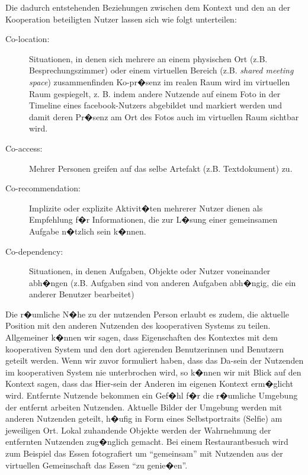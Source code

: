 Die dadurch entstehenden Beziehungen zwischen dem Kontext und den an der Kooperation beteiligten Nutzer lassen sich wie folgt unterteilen:

\begin{description}

\item[Co-location:]  Situationen, in denen sich mehrere an einem physischen Ort (z.B. Besprechungszimmer) oder einem virtuellen Bereich (z.B. \textit{shared meeting space}) zusammenfinden
Ko-pr�senz im realen Raum wird im virtuellen Raum gespiegelt, z. B. indem andere Nutzende auf einem Foto in der Timeline eines facebook-Nutzers abgebildet und markiert werden und damit deren Pr�senz am Ort des Fotos auch im virtuellen Raum sichtbar wird.


\item[Co-access:] Mehrer Personen greifen auf das selbe Artefakt (z.B. Textdokument) zu.

\item[Co-recommendation:] Implizite oder explizite Aktivit�ten mehrerer Nutzer dienen als Empfehlung f�r Informationen, die zur L�sung einer gemeinsamen Aufgabe n�tzlich sein k�nnen.

\item[Co-dependency:] Situationen, in denen Aufgaben, Objekte oder Nutzer voneinander abh�ngen (z.B. Aufgaben sind von anderen Aufgaben abh�ngig, die ein anderer Benutzer bearbeitet)

\end{description}

Die r�umliche N�he zu der nutzenden Person erlaubt es zudem, die aktuelle Position mit den anderen Nutzenden des kooperativen Systems zu teilen. Allgemeiner k�nnen wir sagen, dass Eigenschaften des Kontextes mit dem kooperativen System und den dort agierenden Benutzerinnen und Benutzern geteilt werden. Wenn wir zuvor formuliert haben, dass das Da-sein der Nutzenden im kooperativen System nie unterbrochen wird, so k�nnen wir mit Blick auf den Kontext sagen, dass das Hier-sein der Anderen im eigenen Kontext erm�glicht wird. Entfernte Nutzende bekommen ein Gef�hl f�r die r�umliche Umgebung der entfernt arbeiten Nutzenden. Aktuelle Bilder der Umgebung werden mit anderen Nutzenden geteilt, h�ufig in Form eines Selbstportraits (Selfie) am jeweiligen Ort. Lokal zuhandende Objekte werden der Wahrnehmung der entfernten Nutzenden zug�nglich gemacht. Bei einem Restaurantbesuch wird zum Beispiel das Essen fotografiert um ``gemeinsam'' mit Nutzenden aus der virtuellen Gemeinschaft das Essen ``zu genie�en''. 


